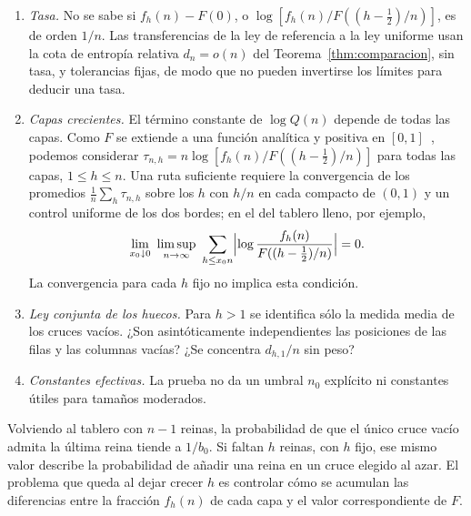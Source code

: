 \begin{enumerate}[1.]
\item \emph{Tasa.} No se sabe si $f_h(n)-F(0)$, o $\log[f_h(n)/F((h-\frac12)/n)]$, es de orden
$1/n$. Las transferencias de la ley de referencia a la ley uniforme usan la cota de
entropía relativa $d_n=o(n)$ del Teorema~\ref{thm:comparacion}, sin tasa, y tolerancias fijas, de
modo que no pueden invertirse los límites para deducir una tasa.
\item \emph{Capas crecientes.} El término constante de $\log Q(n)$ depende de todas las capas.
Como $F$ se extiende a una función analítica y positiva en $[0,1]$~\cite[Teorema~8.1]{Perfil},
podemos considerar $\tau_{n,h}=n\log[f_h(n)/F((h-\frac12)/n)]$ para todas las capas,
$1\le h\le n$. Una ruta suficiente requiere la convergencia de los promedios
$\frac1n\sum_h\tau_{n,h}$ sobre los $h$ con $h/n$ en cada compacto de $(0,1)$ y un control
uniforme de los dos bordes; en el del tablero lleno, por ejemplo,
\[
 \lim_{x_0\downarrow0}\ \limsup_{n\to\infty}\ \sum_{h\le x_0n}
 \Bigl|\log\frac{f_h(n)}{F((h-\frac12)/n)}\Bigr|=0 .
\]
La convergencia para cada $h$ fijo no implica esta condición.
\item \emph{Ley conjunta de los huecos.} Para $h>1$ se identifica sólo la medida media de los
cruces vacíos. ¿Son asintóticamente independientes las posiciones de las filas y las columnas vacías? ¿Se
concentra
$d_{h,1}/n$ sin peso?
\item \emph{Constantes efectivas.} La prueba no da un umbral $n_0$ explícito ni constantes útiles
para tamaños moderados.
\end{enumerate}

Volviendo al tablero con $n-1$ reinas, la probabilidad de que el único cruce vacío
admita la última reina tiende a $1/b_0$. Si faltan $h$ reinas, con $h$ fijo, ese
mismo valor describe la probabilidad de añadir una reina en un cruce elegido al azar.
El problema que queda al dejar crecer $h$ es controlar cómo se acumulan las
diferencias entre la fracción $f_h(n)$ de cada capa y el valor correspondiente de $F$.
